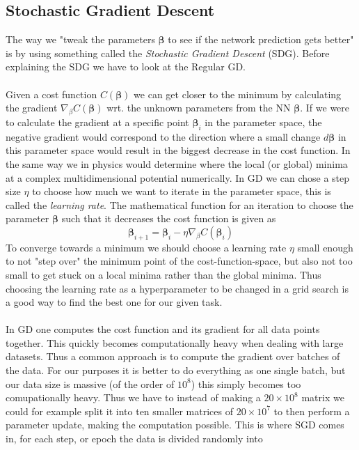 \documentclass[14pt, a4paper]{book}
\begin{document}
\subsection{Stochastic Gradient Descent}\label{sec:SGD}
The way we "tweak the parameters $\bm \beta $ to see if the network prediction gets better" is by using something called the \textit{Stochastic Gradient Descent} (SDG). Before explaining the SDG we have to look at the Regular GD. \\
\\Given a cost function $C(\bm{\beta})$ we can get closer to the minimum by calculating the gradient $\nabla_{\beta}C(\bm{\beta})$ wrt. the unknown parameters from the NN $\bm\beta$. If we were to calculate the gradient at a specific 
point $\bm{\beta}_i$ in the parameter space, the negative gradient would correspond to the direction where a small change $d\bm\beta$ in this parameter space would result in the biggest decrease in the cost function. 
In the same way we in physics would determine where the local (or global) minima at a complex multidimensional potential numerically. In GD we can chose a step size $\eta$ to choose how much we want to iterate in the parameter space, 
this is called the \textit{learning rate}. The mathematical function for an iteration to choose the parameter $\bm{\beta}$ such that it decreases the cost function is given as
\begin{equation}\label{eq:GD}
    \bm{\beta}_{i+1}=\bm{\beta}_{i} -\eta\nabla_{\beta}C(\bm{\beta}_i)
\end{equation}
To converge towards a minimum we should choose a learning rate $\eta$ small enough to not "step over" the minimum point of the cost-function-space, but also not too small to get stuck on a local minima rather than the global minima. 
Thus choosing the learning rate as a hyperparameter to be changed in a grid search is a good way to find the best one for our given task.\\
\\In GD one computes the cost function and its gradient for all data points together. This quickly becomes computationally heavy when dealing with large datasets. Thus a common approach is to compute the gradient over batches of the data. 
For our purposes it is better to do everything as one single batch, but our data size is massive (of the order of $10^{8}$) this simply becomes too comupationally heavy. Thus we have to instead of making a $20\times10^8$ matrix 
we could for example split it into ten smaller matrices of $20\times10^7$ to then perform a parameter update, making the computation possible. This is where SGD comes in, for each step, or epoch the data is divided randomly into 
\end{document}
